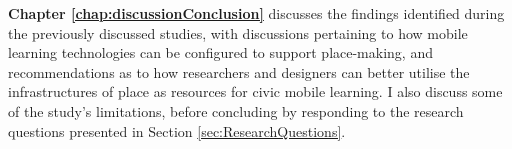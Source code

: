 \textbf{Chapter \ref{chap:discussionConclusion}} discusses the findings identified during the previously discussed studies, with discussions pertaining to how mobile learning technologies can be configured to support place-making, and recommendations as to how researchers and designers can better utilise the infrastructures of place as resources for civic mobile learning. I also discuss some of the study’s limitations, before concluding by responding to the research questions presented in Section \ref{sec:ResearchQuestions}.